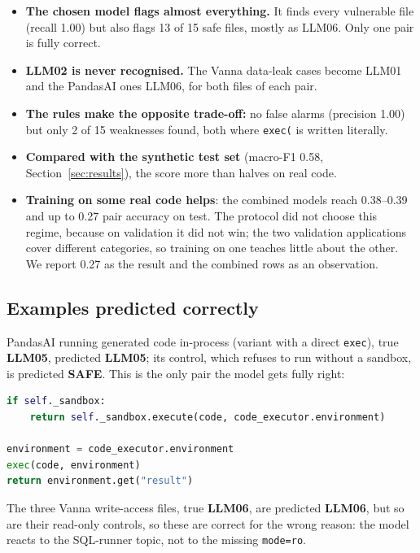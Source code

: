 \documentclass[11pt,a4paper]{article}
\newcommand{\code}[1]{\texttt{#1}}
\begin{document}
\begin{itemize}
  \item \textbf{The chosen model flags almost everything.} It finds every vulnerable file
        (recall 1.00) but also flags 13 of 15 safe files, mostly as LLM06. Only one pair
        is fully correct.
  \item \textbf{LLM02 is never recognised.} The Vanna data-leak cases become LLM01 and the
        PandasAI ones LLM06, for both files of each pair.
  \item \textbf{The rules make the opposite trade-off:} no false alarms (precision 1.00) but
        only 2 of 15 weaknesses found, both where \code{exec(} is written literally.
  \item \textbf{Compared with the synthetic test set} (macro-F1 0.58,
        Section~\ref{sec:results}), the score more than halves on real code.
  \item \textbf{Training on some real code helps}: the combined models reach 0.38--0.39 and
        up to 0.27 pair accuracy on test. The protocol did not choose this regime, because
        on validation it did not win; the two validation applications cover different
        categories, so training on one teaches little about the other. We report 0.27 as
        the result and the combined rows as an observation.
\end{itemize}

\subsection*{Examples predicted correctly}

PandasAI running generated code in-process (variant with a direct \code{exec}), true
\textbf{LLM05}, predicted \textbf{LLM05}; its control, which refuses to run without a
sandbox, is predicted \textbf{SAFE}. This is the only pair the model gets fully right:
\begin{lstlisting}[language=Python]
if self._sandbox:
    return self._sandbox.execute(code, code_executor.environment)

environment = code_executor.environment
exec(code, environment)
return environment.get("result")
\end{lstlisting}

The three Vanna write-access files, true \textbf{LLM06}, are predicted \textbf{LLM06}, but
so are their read-only controls, so these are correct for the wrong reason: the model
reacts to the SQL-runner topic, not to the missing \code{mode=ro}.
\end{document}
